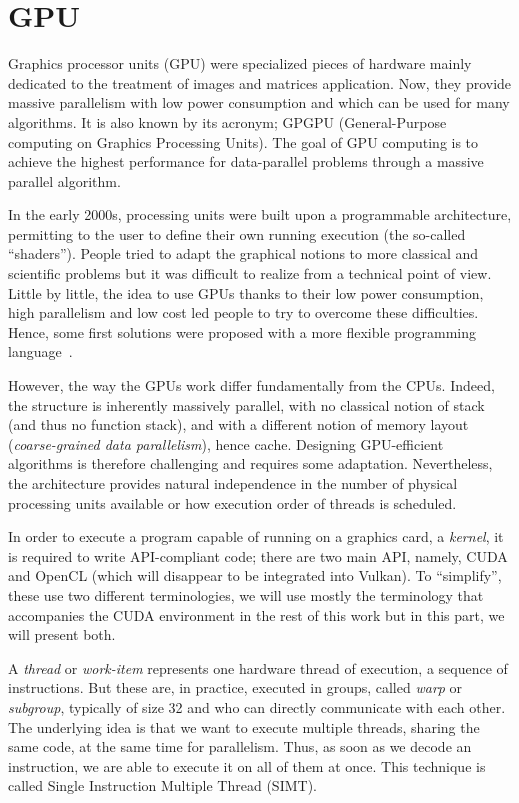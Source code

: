 
\section{GPU}\label{GPU}

Graphics processor units (GPU) were specialized pieces of hardware mainly dedicated to the treatment of images and matrices application. Now, they provide massive parallelism with low power consumption and which can be used for many algorithms. It is also known by its acronym; GPGPU (General-Purpose computing on Graphics Processing Units). The goal of GPU computing is to achieve the highest performance for data-parallel problems through a massive parallel algorithm.

In the early 2000s, processing units were built upon a programmable architecture, permitting to the user to define their own running execution (the so-called ``shaders''). People tried to adapt the graphical notions to more classical and scientific problems but it was difficult to realize from a technical point of view. Little by little, the idea to use GPUs thanks to their low power consumption, high parallelism and low cost led people to try to overcome these difficulties. Hence, some first solutions were proposed with a more flexible programming language~\cite{buck2004brook}.

However, the way the GPUs work differ fundamentally from the CPUs. Indeed, the structure is inherently massively parallel, with no classical notion of stack (and thus no function stack), and with a different notion of memory layout (\textit{coarse-grained data parallelism}), hence cache. Designing GPU-efficient algorithms is therefore challenging and requires some adaptation. Nevertheless, the architecture provides natural independence in the number of physical processing units available or how execution order of threads is scheduled.

In order to execute a program capable of running on a graphics card, a \textit{kernel}, it is required to write API-compliant code; there are two main API, namely, CUDA and OpenCL (which will disappear to be integrated into Vulkan). To ``simplify'', these use two different terminologies, we will use mostly the terminology that accompanies the CUDA environment in the rest of this work but in this part, we will present both.

A \textit{thread} or \textit{work-item} represents one hardware thread of execution, a sequence of instructions. But these are, in practice, executed in groups, called \textit{warp} or \textit{subgroup}, typically of size 32 and who can directly communicate with each other. The underlying idea is that we want to execute multiple threads, sharing the same code, at the same time for parallelism. Thus, as soon as we decode an instruction, we are able to execute it on all of them at once. This technique is called Single Instruction Multiple Thread (SIMT).

